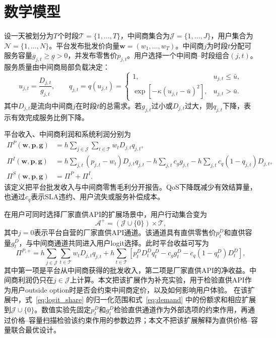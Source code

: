 \documentclass[UTF8,11pt]{ctexart}
\newcommand{\qos}{q}
\newcommand{\T}{\mathcal{T}}
\newcommand{\J}{\mathcal{J}}
\newcommand{\N}{\mathcal{N}}
\newcommand{\A}{\mathcal{A}}
\newcommand{\D}{D}
\newcommand{\w}{\boldsymbol{w}}
\newcommand{\p}{\boldsymbol{p}}
\newcommand{\g}{\boldsymbol{g}}
\begin{document}
\section{数学模型}
\label{sec:formulation}

设一天被划分为$T$个时段$\T=\{1,\ldots,T\}$，中间商集合为$\J=\{1,\ldots,J\}$，用户集合为$\N=\{1,\ldots,N\}$。平台发布批发价向量$\w=(w_1,\ldots,w_T)$。中间商$j$为时段$t$分配可服务容量$g_{j,t}\ge \underline g>0$，并发布零售价$p_{j,t}$。用户选择一个中间商--时段组合$(j,t)$。服务质量由中间商局部负载决定：
\begin{equation}
  u_{j,t}=\frac{\D_{j,t}}{g_{j,t}},\qquad
  q_{j,t}=\qos(u_{j,t})=
  \begin{cases}
    1, & u_{j,t}\le \bar u,\\
    \exp[-\kappa(u_{j,t}-\bar u)^2], & u_{j,t}>\bar u.
  \end{cases}
  \label{eq:qos}
\end{equation}
其中$\D_{j,t}$是流向中间商$j$在时段$t$的总需求。若$g_{j,t}$过小或$\D_{j,t}$过大，则$q_{j,t}$下降，表示有效完成服务比例下降。

平台收入、中间商利润和系统利润分别为
\begin{align}
  \Pi^P(\w,\p,\g)
  &=h\sum_{j\in\J}\sum_{t\in\T} w_t\D_{j,t}q_{j,t}, \label{eq:platform_profit}\\
  \Pi^I(\w,\p,\g)
  &=h\sum_{j,t}(p_{j,t}-w_t)\D_{j,t}q_{j,t}
    -h\sum_{j,t}c_g g_{j,t}
    -h\sum_{j,t}c_q(1-q_{j,t})\D_{j,t}, \label{eq:intermediary_profit}\\
  \Pi^S(\w,\p,\g)&=\Pi^P+\Pi^I. \label{eq:system_profit}
\end{align}
该定义把平台批发收入与中间商零售毛利分开报告。QoS下降既减少有效结算量，也通过$c_q$表示SLA违约、用户流失或服务补偿成本。

在用户可同时选择厂家直供API的扩展场景中，用户行动集合变为
\begin{equation}
  \A^+=(\J\cup\{0\})\times\T,
  \label{eq:direct_api_action_set}
\end{equation}
其中$j=0$表示平台自营的厂家直供API通道。该通道具有直供零售价$p^D_t$和直供容量$g^D_t$，与中间商通道共同进入用户logit选择。此时平台收益可写为
\begin{equation}
  \Pi^{P,+}
  =h\sum_{j\in\J}\sum_{t\in\T}w_t\D_{j,t}q_{j,t}
  +h\sum_{t\in\T}\left[
    p^D_t\D^D_tq^D_t-c_g g^D_t-c_q(1-q^D_t)\D^D_t
  \right],
  \label{eq:direct_platform_payoff}
\end{equation}
其中第一项是平台从中间商获得的批发收入，第二项是厂家直供API的净收益。中间商利润仍只在$j\in\J$上计算。本文把该扩展作为补充实验，用于检验直供API作为用户outside option时是否会约束中间商定价，以及如何影响用户体验。
在该扩展中，式~\eqref{eq:logit_share} 的归一化范围和式~\eqref{eq:demand} 中的份额求和相应扩展到$\J\cup\{0\}$。数值实验先固定$p^D_t$和$g^D_t$检验直供通道作为外部选项的约束作用，再通过价格--容量扫描检验该约束作用的参数边界；本文不把该扩展解释为直供价格--容量联合最优设计。
\end{document}
